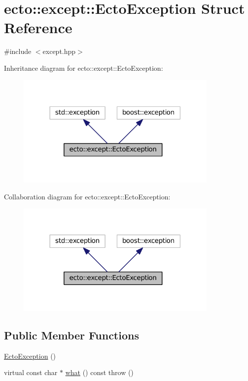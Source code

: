 \hypertarget{structecto_1_1except_1_1EctoException}{}\section{ecto\+:\+:except\+:\+:Ecto\+Exception Struct Reference}
\label{structecto_1_1except_1_1EctoException}


{\ttfamily \#include $<$except.\+hpp$>$}



Inheritance diagram for ecto\+:\+:except\+:\+:Ecto\+Exception\+:\nopagebreak
\begin{figure}[H]
\begin{center}
\leavevmode
\includegraphics[width=278pt]{structecto_1_1except_1_1EctoException__inherit__graph}
\end{center}
\end{figure}


Collaboration diagram for ecto\+:\+:except\+:\+:Ecto\+Exception\+:\nopagebreak
\begin{figure}[H]
\begin{center}
\leavevmode
\includegraphics[width=278pt]{structecto_1_1except_1_1EctoException__coll__graph}
\end{center}
\end{figure}
\subsection*{Public Member Functions}
\begin{DoxyCompactItemize}
\item 
\hyperlink{structecto_1_1except_1_1EctoException_a5e4d1414677cf716b57620c8721b0078}{Ecto\+Exception} ()
\item 
virtual const char $\ast$ \hyperlink{structecto_1_1except_1_1EctoException_ab8f456a7153321c3424e9d6780170f4a}{what} () const   throw ()
\end{DoxyCompactItemize}


